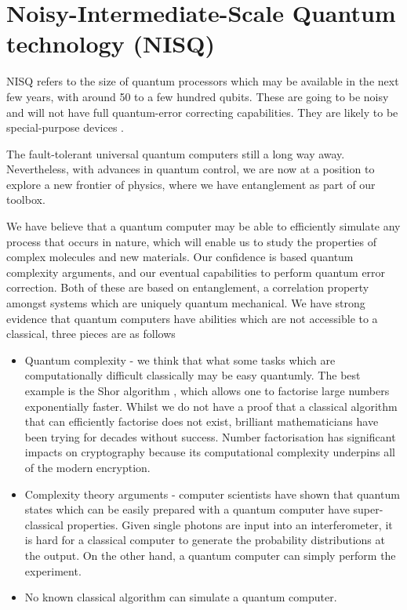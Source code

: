 \section{Noisy-Intermediate-Scale Quantum technology (NISQ)}
NISQ refers to the size of quantum processors which may be available in the next few years, with around 50 to a few hundred qubits. These are going to be noisy and will not have full quantum-error correcting capabilities. They are likely to be special-purpose devices \cite{preskill2018quantum}.

The fault-tolerant universal quantum computers still a long way away. Nevertheless, 
with advances in quantum control,
we are now at a position to explore a new frontier of physics, where we have entanglement
as part of our toolbox.



We have believe that a quantum computer may be able to efficiently simulate any process that occurs in nature, which will enable us to study the properties of complex molecules and new materials. 
Our confidence is based quantum complexity arguments, and our eventual capabilities to perform
 quantum error correction. 
Both of these are based on entanglement, a correlation property amongst systems which are uniquely quantum mechanical. We have strong evidence that quantum computers have abilities which are not
accessible to a classical, three pieces are as follows
\begin{itemize}
\item Quantum complexity - we think that what some tasks which are computationally difficult classically
may be easy quantumly. The best example is the Shor algorithm \cite{shor1994algorithms},
 which allows one to factorise large numbers exponentially faster. 
 Whilst we do not have a proof that a classical algorithm that can efficiently factorise does not exist, brilliant mathematicians have been trying for decades without success. Number factorisation has significant impacts on cryptography because its computational complexity underpins all of the modern encryption. 
% 
\item Complexity theory arguments - computer scientists have shown that quantum states which can be easily prepared with a quantum computer have super-classical properties. Given single photons are input
into an interferometer, it is hard for a classical computer to generate the probability distributions at the output. On the other hand, a quantum computer can simply perform the experiment.
% 
\item No known classical algorithm can simulate a quantum computer.
\end{itemize}

